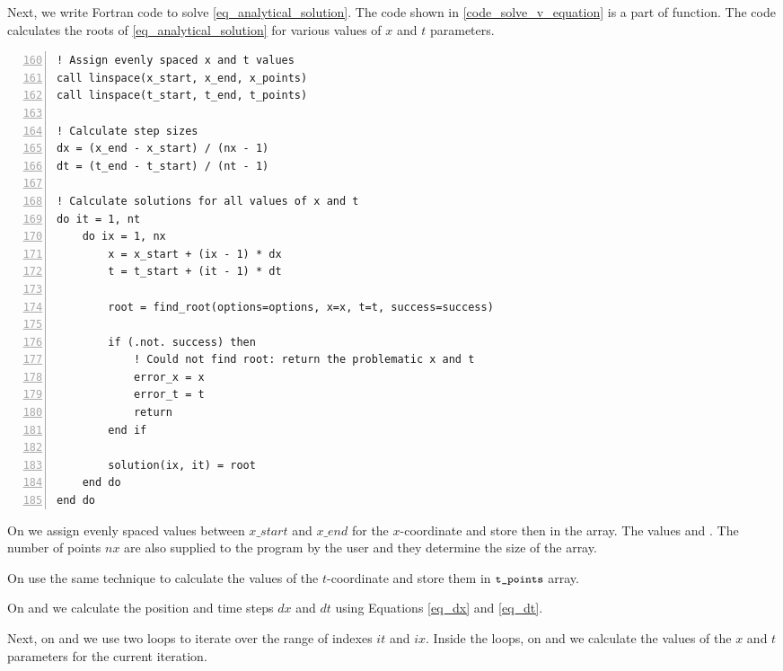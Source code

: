 Next, we write Fortran code to solve \autoref{eq_analytical_solution}. The code shown in \autoref{code_solve_v_equation} is a part of  function. The code calculates the roots of \autoref{eq_analytical_solution} for various values of $x$ and $t$ parameters.

\noindent\begin{minipage}{\linewidth}
\begin{lstlisting}[caption={Solving $v = \cos (x - v t )$ equation for various values of parameters $x$ and $t$ (\code{root\_finder.f90}).},frame=tlrb,label={code_solve_v_equation}, numbers=left, firstnumber=160]
! Assign evenly spaced x and t values
call linspace(x_start, x_end, x_points)
call linspace(t_start, t_end, t_points)

! Calculate step sizes
dx = (x_end - x_start) / (nx - 1)
dt = (t_end - t_start) / (nt - 1)

! Calculate solutions for all values of x and t
do it = 1, nt
    do ix = 1, nx
        x = x_start + (ix - 1) * dx
        t = t_start + (it - 1) * dt

        root = find_root(options=options, x=x, t=t, success=success)

        if (.not. success) then
            ! Could not find root: return the problematic x and t
            error_x = x
            error_t = t
            return
        end if

        solution(ix, it) = root
    end do
end do
\end{lstlisting}
\end{minipage}

On  we assign evenly spaced values between $x\_start$ and $x\_end$ for the $x$-coordinate and store then in the  array. The values  and . The number of points $nx$ are also supplied to the program by the user and they determine the size of the  array.

On  use the same technique to calculate the values of the $t$-coordinate and store them in $\texttt{\small t\_points}$ array.

On  and  we calculate the position and time steps $dx$ and $dt$ using Equations \ref{eq_dx} and \ref{eq_dt}.

Next, on  and  we use two loops to iterate over the range of indexes $it$ and $ix$. Inside the loops, on  and  we calculate the values of the $x$ and $t$ parameters for the current iteration.

